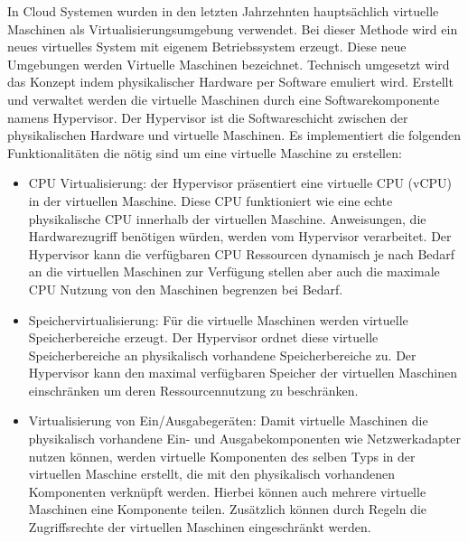 In Cloud Systemen wurden in den letzten Jahrzehnten hauptsächlich virtuelle Maschinen als Virtualisierungsumgebung verwendet. Bei dieser Methode wird ein neues virtuelles System mit eigenem Betriebssystem erzeugt. Diese neue Umgebungen werden Virtuelle Maschinen bezeichnet. \cite{Pahl2015} Technisch umgesetzt wird das Konzept indem physikalischer Hardware per Software emuliert wird. Erstellt und verwaltet werden die virtuelle Maschinen durch eine Softwarekomponente namens Hypervisor. Der Hypervisor ist die Softwareschicht zwischen der physikalischen Hardware und virtuelle Maschinen. Es implementiert die folgenden Funktionalitäten die nötig sind um eine virtuelle Maschine zu erstellen:
\begin{itemize}
	\item CPU Virtualisierung: der Hypervisor präsentiert eine virtuelle CPU (vCPU) in der virtuellen Maschine. Diese CPU funktioniert wie eine echte physikalische CPU innerhalb der virtuellen Maschine. Anweisungen, die Hardwarezugriff benötigen würden, werden vom Hypervisor verarbeitet. Der Hypervisor kann die verfügbaren CPU Ressourcen dynamisch je nach Bedarf an die virtuellen Maschinen zur Verfügung stellen aber auch die maximale CPU Nutzung von den Maschinen begrenzen bei Bedarf. 
	\item Speichervirtualisierung: Für die virtuelle Maschinen werden virtuelle Speicherbereiche erzeugt. Der Hypervisor ordnet diese virtuelle Speicherbereiche an physikalisch vorhandene Speicherbereiche zu. Der Hypervisor kann den maximal verfügbaren Speicher der virtuellen Maschinen einschränken um deren Ressourcennutzung zu beschränken.
	\item Virtualisierung von Ein/Ausgabegeräten: Damit virtuelle Maschinen die physikalisch vorhandene Ein- und Ausgabekomponenten wie Netzwerkadapter nutzen können, werden virtuelle Komponenten des selben Typs in der virtuellen Maschine erstellt, die mit den physikalisch vorhandenen Komponenten verknüpft werden. Hierbei können auch mehrere virtuelle Maschinen eine Komponente teilen. Zusätzlich können durch Regeln die Zugriffsrechte der virtuellen Maschinen eingeschränkt werden.  \cite{Dall2014}
\end{itemize}
